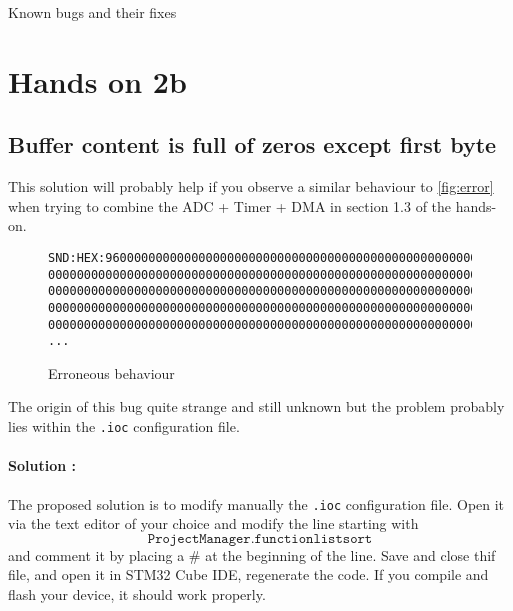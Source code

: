 \documentclass[a4paper,11pt]{article}
\begin{document}
\renewcommand{\figurename}{Fig.}

\renewcommand{\thepage}{\arabic{page}}
\setcounter{page}{1}
\pagestyle{main}
\newpage \clearpage

\begin{center}
\begin{huge}
Known bugs and their fixes
\end{huge}
\vspace{0.3cm}
\end{center}

\section{Hands on 2b}
\subsection{Buffer content is full of zeros except first byte}
This solution will probably help if you observe a similar behaviour to \autoref{fig:error} when trying to combine the ADC + Timer + DMA in section 1.3 of the hands-on.
\begin{figure}[h]
\begin{lstlisting}
SND:HEX:96000000000000000000000000000000000000000000000000000000000000
0000000000000000000000000000000000000000000000000000000000000000000000
0000000000000000000000000000000000000000000000000000000000000000000000
0000000000000000000000000000000000000000000000000000000000000000000000
0000000000000000000000000000000000000000000000000000000000000000000000
...
\end{lstlisting}
\caption{Erroneous behaviour}
\label{fig:error}
\end{figure}

The origin of this bug quite strange and still unknown but the problem probably lies within the \texttt{.ioc} configuration file.\\

\paragraph{Solution : } The proposed solution is to modify manually the \texttt{.ioc} configuration file. Open it via the text editor of your choice and modify the line starting with
\[\texttt{ProjectManager.functionlistsort}\]
and comment it by placing a \# at the beginning of the line. Save and close thif file, and open it in STM32 Cube IDE, regenerate the code. If you compile and flash your device, it should work properly.
\end{document}
